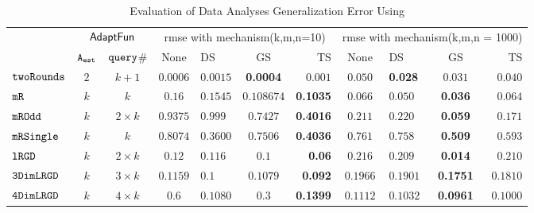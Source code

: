 {\footnotesize
\begin {table}[t]
        \vspace{-0.5cm}
        \caption{Evaluation of Data Analyses Generalization Error Using {\THESYSTEM}}
    \vspace{-0.4cm}
        \label{tb:adapt-generalization}
        \begin{center}
        \centering
{
        \begin{tabular}{|| >{\tiny}l || c | c || c | l | c | r || c | l | c | r || }
                \hhline{t|:=========== :t:|}
        \multirow{2}{*}{Program $c$}
         & \multicolumn{2}{c||}{$\textsf{AdaptFun}$}
         & \multicolumn{4}{c||}{rmse with mechanism(k,m,n=10)}  & \multicolumn{4}{c||}{rmse with mechanism(k,m,n = 1000)}  \\ 
         \hhline{||~--||----||----||}
         & {${\mathtt{A_{est}}}$ } & {${\tt query}$\# }  & None  & DS & GS & TS & None & DS & GS & TS \\ 
         \hline \hline
        $  \mathtt{ twoRounds }$ & $ 2 $ & $  k + 1 $  & $0.0006$   & {{$0.0015$}} & \textbf{0.0004} & {$0.001$}& $0.050$   & {\textbf{0.028}} & {$0.031$} & $0.040$  \\
        \hhline{||-||---||-||--||----||}
         $  \mathtt{ mR}$ & $k$ & $k$  & $0.16$   & $0.1545$  & $0.108674 $ & \textbf{0.1035}  & $0.066$   & $0.050$ & {\textbf{0.036}} & $0.064$  \\
         \hhline{||-||---||-||--||----||}
         $  \mathtt{ mROdd }$ & $ k $   & $  2 \times k $ & $0.9375$   & $0.999$ & $0.7427$ & {\textbf{0.4016}} & $0.211$   & $0.220$ & {\textbf{0.059}} & $0.171$  \\
         \hhline{||-||---||-||--||----||}
         $  \mathtt{ mRSingle }$ & $ k $ & $  k $  & $0.8074$   & $0.3600$ & $ 0.7506$ & {\textbf{0.4036}} & $ 0.761$   & $ 0.758$ & {\textbf{0.509}} & $ 0.593$  \\
         \hhline{||-||---||-||--||----||}
         $  \mathtt{ lRGD }$ & $ k $ & $  2\times k $  & $0.12$   & $0.116$ & $ 0.1 $ & \textbf{0.06} & $0.216$   & $0.209$ & \textbf{0.014} & $0.210$  \\
         \hhline{||-||---||-||--||----||}
         $  \mathtt{ 3DimLRGD }$ & $ k $ & $  3\times k $  & $0.1159$   & $0.1$ & $0.1079$ & \textbf{0.092} & $0.1966$   & $0.1901$ & \textbf{0.1751} & $0.1810$  \\
         \hhline{||-||---||-||--||----||}
         $  \mathtt{ 4DimLRGD }$ & $ k $ & $  4\times k $   & $0.6$   & $0.1080$ & $0.3 $ & \textbf{0.1399} & $0.1112$   & $0.1032$ & \textbf{0.0961} & $0.1000$  \\

\end{tabular}}
\end{center}
\end{table}}
